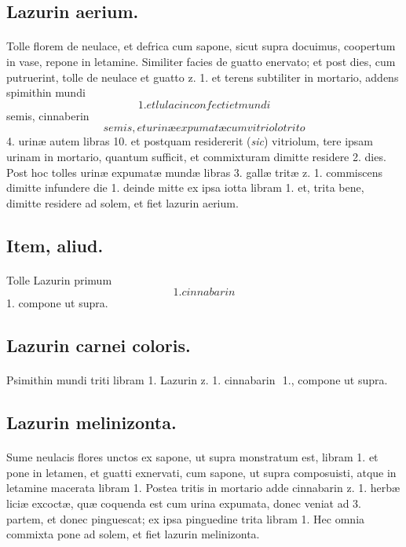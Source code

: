 \documentclass[a4paper, 11pt, oneside, polutonikogreek, italian]{article}
\newcommand*\svgaaa{}
\begin{document}
\subsection{Lazurin aerium.}
\paragraph{}
Tolle florem de neulace, et defrica cum sapone, sicut supra docuimus, coopertum in vase, repone in letamine. Similiter facies de guatto enervato; et post dies, cum putruerint, tolle de neulace et guatto z. 1. et terens subtiliter in mortario, addens spimithin mundi $\svgaaa$ 1. et lulacin confecti et mundi $\svgaaa$ semis, cinnaberin $\svgaaa$ semis, et urinæ expumatæ cum vitriolo trito $\svgaaa$ 4. urinæ autem libras 10. et postquam residererit (\emph{sic}) vitriolum, tere ipsam urinam in mortario, quantum sufficit, et commixturam dimitte residere 2. dies. Post hoc tolles urinæ expumatæ mundæ libras 3. gallæ tritæ z. 1. commiscens dimitte infundere die 1. deinde mitte ex ipsa iotta libram 1. et, trita bene, dimitte residere ad solem, et fiet lazurin aerium.

\subsection{Item, aliud.}
\paragraph{}
Tolle Lazurin primum $\svgaaa$ 1. cinnabarin $\svgaaa$ 1. compone ut supra.

\subsection{Lazurin carnei coloris.}
\paragraph{}
Psimithin mundi triti libram 1. Lazurin z. 1. cinnabarin $\svgaaa$ 1., compone ut supra.

\subsection{Lazurin melinizonta.}
\paragraph{}
Sume neulacis flores unctos ex sapone, ut supra monstratum est, libram 1. et pone in letamen, et guatti exnervati, cum sapone, ut supra composuisti, atque in letamine macerata libram 1. Postea tritis in mortario adde cinnabarin z. 1. herbæ liciæ excoctæ, quæ coquenda est cum urina expumata, donec veniat ad 3. partem, et donec pinguescat; ex ipsa pinguedine trita libram 1. Hec omnia commixta pone ad solem, et fiet lazurin melinizonta.
\end{document}
